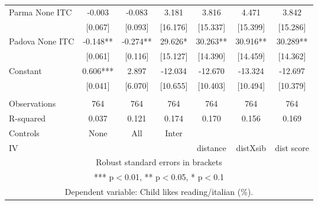 \begin{tabular}{lcccccc}
Parma None ITC & -0.003 & -0.083 & 3.181 & 3.816 & 4.471 & 3.842 \\
 & [0.067] & [0.093] & [16.176] & [15.337] & [15.399] & [15.286] \\
Padova None ITC & -0.148** & -0.274** & 29.626* & 30.263** & 30.916** & 30.289** \\
 & [0.061] & [0.116] & [15.127] & [14.390] & [14.459] & [14.362] \\
Constant & 0.606*** & 2.897 & -12.034 & -12.670 & -13.324 & -12.697 \\
 & [0.041] & [6.070] & [10.655] & [10.403] & [10.494] & [10.379] \\
 &  &  &  &  &  &  \\
Observations & 764 & 764 & 764 & 764 & 764 & 764 \\
R-squared & 0.037 & 0.121 & 0.174 & 0.170 & 0.156 & 0.169 \\
Controls & None & All & Inter &  &  &  \\
 IV &  &  &  & distance & distXsib & dist score \\ \hline
\multicolumn{7}{c}{ Robust standard errors in brackets} \\
\multicolumn{7}{c}{ *** p$<$0.01, ** p$<$0.05, * p$<$0.1} \\
\multicolumn{7}{c}{ Dependent variable: Child likes reading/italian (\%).} \\
\end{tabular}
